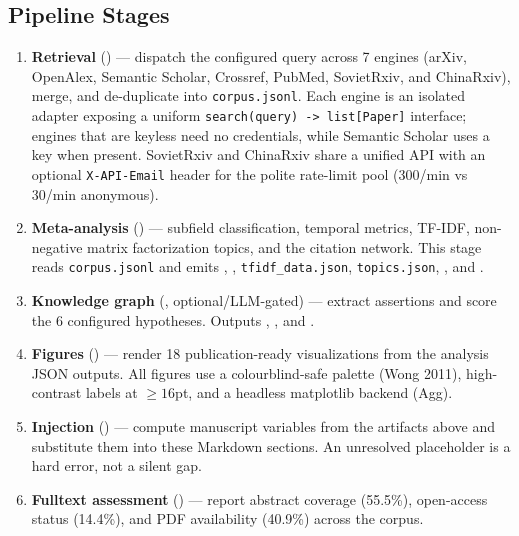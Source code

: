 \documentclass[
  english,
]{article}
\begin{document}
\subsection{Pipeline Stages}\label{pipeline-stages}

\begin{enumerate}
\def\labelenumi{\arabic{enumi}.}
\item
  \textbf{Retrieval} () --- dispatch
  the configured query across 7 engines (arXiv, OpenAlex, Semantic
  Scholar, Crossref, PubMed, SovietRxiv, and ChinaRxiv), merge, and
  de-duplicate into \texttt{corpus.jsonl}. Each engine is an isolated
  adapter exposing a uniform
  \texttt{search(query)\ -\textgreater{}\ list{[}Paper{]}} interface;
  engines that are keyless need no credentials, while Semantic Scholar
  uses a key when present. SovietRxiv and ChinaRxiv share a unified API
  with an optional \texttt{X-API-Email} header for the polite rate-limit
  pool (300/min vs 30/min anonymous).
\item
  \textbf{Meta-analysis} () ---
  subfield classification, temporal metrics, TF-IDF, non-negative matrix
  factorization topics, and the citation network. This stage reads
  \texttt{corpus.jsonl} and emits
  ,
  , \texttt{tfidf\_data.json},
  \texttt{topics.json}, , and
  .
\item
  \textbf{Knowledge graph} (,
  optional/LLM-gated) --- extract assertions and score the 6 configured
  hypotheses. Outputs ,
  , and
  .
\item
  \textbf{Figures} () --- render 18
  publication-ready visualizations from the analysis JSON outputs. All
  figures use a colourblind-safe palette (Wong 2011), high-contrast
  labels at \(\geq 16\)pt, and a headless matplotlib backend (Agg).
\item
  \textbf{Injection} () --- compute
  manuscript variables from the artifacts above and substitute them into
  these Markdown sections. An unresolved placeholder is a hard error,
  not a silent gap.
\item
  \textbf{Fulltext assessment} ()
  --- report abstract coverage (55.5\%), open-access status (14.4\%),
  and PDF availability (40.9\%) across the corpus.
\end{enumerate}
\end{document}
